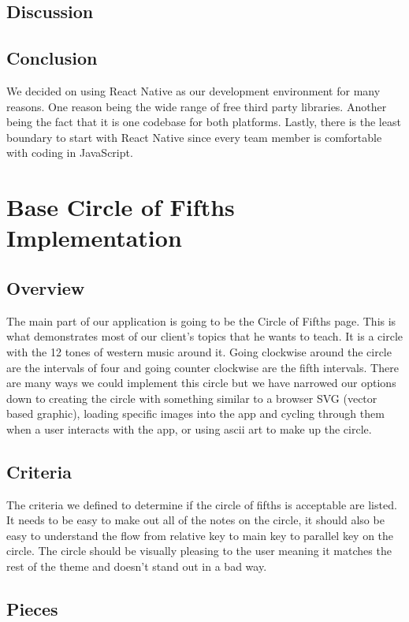 \documentclass[onecolumn, draftclsnofoot,10pt, compsoc]{IEEEtran}
\begin{document}
\subsection{Discussion}
\subsection{Conclusion}
We decided on using React Native as our development environment for many reasons.
One reason being the wide range of free third party libraries.
Another being the fact that it is one codebase for both platforms.
Lastly, there is the least boundary to start with React Native since every team member is comfortable with coding in JavaScript.


\section{Base Circle of Fifths Implementation}
\subsection{Overview}
The main part of our application is going to be the Circle of Fifths page.
This is what demonstrates most of our client's topics that he wants to teach.
It is a circle with the 12 tones of western music around it.
Going clockwise around the circle are the intervals of four and going counter clockwise are the fifth intervals.
There are many ways we could implement this circle but we have narrowed our options down to creating the circle with something similar to a browser SVG (vector based graphic), loading specific images into the app and cycling through them when a user interacts with the app, or using ascii art to make up the circle.

\subsection{Criteria}
The criteria we defined to determine if the circle of fifths is acceptable are listed.
It needs to be easy to make out all of the notes on the circle, it should also be easy to understand the flow from relative key to main key to parallel key on the circle.
The circle should be visually pleasing to the user meaning it matches the rest of the theme and doesn't stand out in a bad way.

\subsection{Pieces}
\end{document}
